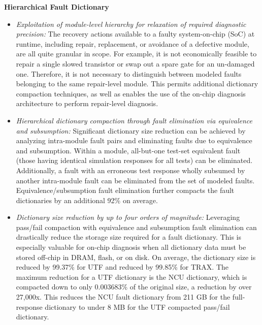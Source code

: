 \textbf{Hierarchical Fault Dictionary}
\begin{itemize}
\item{\textit{Exploitation of module-level hierarchy for relaxation of required diagnostic precision:} The recovery actions available to a faulty system-on-chip (SoC) at runtime, including repair, replacement, or avoidance of a defective module, are all quite granular in scope.
%
For example, it is not economically feasible to repair a single slowed transistor or swap out a spare gate for an un-damaged one.
%
Therefore, it is not necessary to distinguish between modeled faults belonging to the same repair-level module.
%
This permits additional dictionary compaction techniques, as well as enables the use of the on-chip diagnosis architecture to perform repair-level diagnosis.}
\item{\textit{Hierarchical dictionary compaction through fault elimination via equivalence and subsumption:} Significant dictionary size reduction can be achieved by analyzing intra-module fault pairs and eliminating faults due to equivalence and subsumption.
%
Within a module, all-but-one test-set equivalent fault (those having identical simulation responses for all tests) can be eliminated.
%
Additionally, a fault with an erroneous test response wholly subsumed by another intra-module fault can be eliminated from the set of modeled faults.
%
Equivalence/subsumption fault elimination further compacts the fault dictionaries by an additional 92\% on average.}
\item{\textit{Dictionary size reduction by up to four orders of magnitude:} Leveraging pass/fail compaction with equivalence and subsumption fault elimination can drastically reduce the storage size required for a fault dictionary.
%
This is especially valuable for on-chip diagnosis when all dictionary data must be stored off-chip in DRAM, flash, or on disk.
%
On average, the dictionary size is reduced by 99.37\% for UTF and reduced by 99.85\% for TRAX.
%
The maximum reduction for a UTF dictionary is the NCU dictionary, which is compacted down to only 0.003683\% of the original size, a reduction by over 27,000x.
%
This reduces the NCU fault dictionary from 211 GB for the full-response dictionary to under 8 MB for the UTF compacted pass/fail dictionary.}
\end{itemize}

